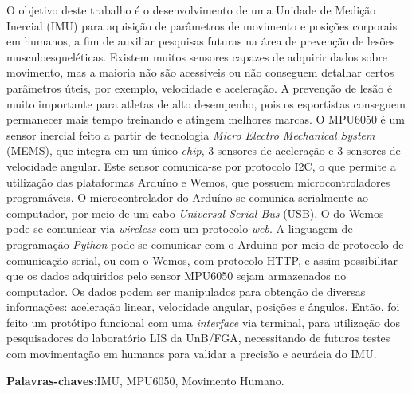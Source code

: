 \begin{resumo}
 
 \noindent
 O objetivo deste trabalho é o desenvolvimento de uma Unidade de Medição Inercial (IMU) para aquisição de parâmetros de movimento e posições corporais em humanos, a fim de auxiliar pesquisas futuras na área de prevenção de lesões musculoesqueléticas. Existem muitos sensores capazes de adquirir dados sobre  movimento, mas a maioria não são acessíveis ou não conseguem detalhar certos parâmetros úteis, por exemplo, velocidade e aceleração. A prevenção de lesão é muito importante para atletas de alto desempenho, pois os esportistas conseguem permanecer mais tempo treinando e atingem melhores marcas. O MPU6050 é um sensor inercial feito a partir de tecnologia \textit{Micro Electro Mechanical System} (MEMS), que integra em um único \textit{chip}, 3 sensores de aceleração e 3 sensores de velocidade angular. Este sensor comunica-se por protocolo I2C, o que permite a utilização das plataformas Arduíno e Wemos, que possuem microcontroladores programáveis. O microcontrolador do Arduíno se comunica serialmente ao computador, por meio de um cabo \textit{Universal  Serial Bus} (USB). O do Wemos pode se comunicar via \textit{wireless} com um protocolo \textit{web}. A linguagem de programação \textit{Python} pode se comunicar com o Arduino por meio de protocolo de comunicação serial, ou com o Wemos, com protocolo HTTP, e assim possibilitar que os dados adquiridos pelo sensor MPU6050 sejam armazenados no computador. Os dados podem ser manipulados para obtenção de diversas informações: aceleração linear, velocidade angular, posições e ângulos. Então, foi feito um protótipo funcional com uma \textit{interface} via terminal, para utilização dos pesquisadores do laboratório LIS da UnB/FGA, necessitando de futuros testes com movimentação em humanos para validar a precisão e acurácia do IMU. 
 
 \vspace{\onelineskip}
 \textbf{Palavras-chaves}:IMU, MPU6050, Movimento Humano.
\end{resumo}
